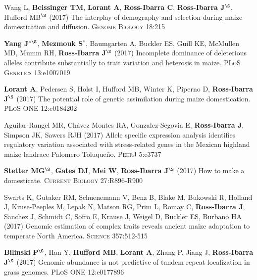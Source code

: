 \begin{etaremune}
\item Wang L, \textbf{Beissinger TM}, \textbf{Lorant A}, \textbf{Ross-Ibarra C}, \textbf{Ross-Ibarra J}$^\S$, Hufford MB$^\S$ (2017) The interplay of demography and selection during maize domestication and diffusion. \textsc{Genome Biology} 18:215

\item {\bf Yang J}$^{*\S}$, {\bf Mezmouk S}$^*$, Baumgarten A, Buckler ES, Guill KE, McMullen MD, Mumm RH, {\bf Ross-Ibarra J}$^\S$ (2017) Incomplete dominance of deleterious alleles contribute substantially to trait variation and heterosis in maize. \textsc{PLoS Genetics} 13:e1007019

\item \textbf{Lorant A}, Pedersen S, Holst I, Hufford MB, Winter K, Piperno D, \textbf{Ross-Ibarra J}$^\S$ (2017) The potential role of genetic assimilation during maize domestication. \textsc{PLoS ONE} 12:e0184202

\item Aguilar-Rangel MR, Ch\`{a}vez Montes RA,  Gonzalez-Segovia E, \textbf{Ross-Ibarra J}, Simpson JK, Sawers RJH (2017) Allele specific expression analysis identifies regulatory variation associated with stress-related genes in the Mexican highland maize landrace Palomero Toluque\~{n}o. \textsc{PeerJ} 5:e3737

\item   {\bf Stetter MG}$^\S$, {\bf Gates DJ}, {\bf Mei W}, {\bf Ross-Ibarra J}$^\S$ (2017) How to make a domesticate. \textsc{Current Biology} 27:R896-R900

\item Swarts K, Gutaker RM,   Schuenemann V,  Benz B,  Blake M, Bukowski R, Holland J, Kruse-Peeples M, Lepak N, Matson RG, Prim L, Romay C, {\bf Ross-Ibarra J}, Sanchez J, Schmidt C,  Sofro E,  Krause J,  Weigel D,  Buckler ES,  Burbano HA (2017) Genomic estimation of complex traits reveals ancient maize adaptation to temperate North America. \textsc{Science} 357:512-515

\item {\bf Bilinski P}$^\S$, Han Y, {\bf Hufford MB}, {\bf Lorant A}, Zhang P, Jiang J, {\bf Ross-Ibarra J}$^\S$ (2017) Genomic abundance is not predictive of tandem repeat localization in grass genomes. \textsc{PLoS ONE} 12:e0177896


\end{etaremune}
